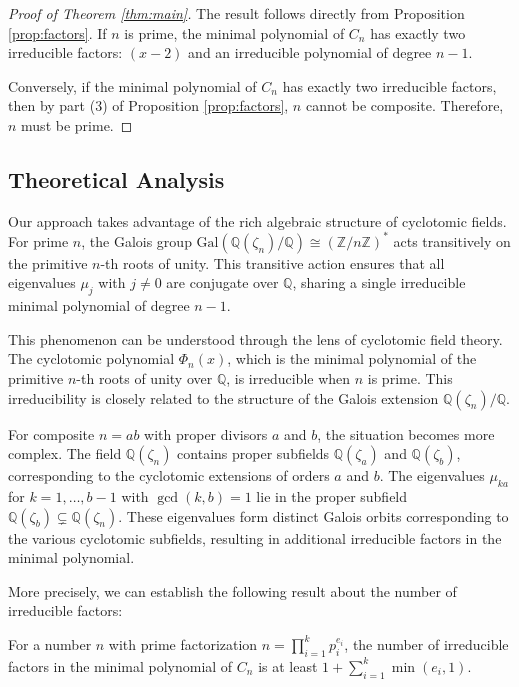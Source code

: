 \begin{proof}[Proof of Theorem \ref{thm:main}]
The result follows directly from Proposition \ref{prop:factors}. If $n$ is prime, the minimal polynomial of $C_n$ has exactly two irreducible factors: $(x-2)$ and an irreducible polynomial of degree $n-1$.

Conversely, if the minimal polynomial of $C_n$ has exactly two irreducible factors, then by part (3) of Proposition \ref{prop:factors}, $n$ cannot be composite. Therefore, $n$ must be prime.
\end{proof}

\subsection{Theoretical Analysis}

Our approach takes advantage of the rich algebraic structure of cyclotomic fields. For prime $n$, the Galois group $\text{Gal}(\mathbb{Q}(\zeta_n)/\mathbb{Q}) \cong (\mathbb{Z}/n\mathbb{Z})^*$ acts transitively on the primitive $n$-th roots of unity. This transitive action ensures that all eigenvalues $\mu_j$ with $j \neq 0$ are conjugate over $\mathbb{Q}$, sharing a single irreducible minimal polynomial of degree $n-1$.

This phenomenon can be understood through the lens of cyclotomic field theory. The cyclotomic polynomial $\Phi_n(x)$, which is the minimal polynomial of the primitive $n$-th roots of unity over $\mathbb{Q}$, is irreducible when $n$ is prime. This irreducibility is closely related to the structure of the Galois extension $\mathbb{Q}(\zeta_n)/\mathbb{Q}$.

For composite $n = ab$ with proper divisors $a$ and $b$, the situation becomes more complex. The field $\mathbb{Q}(\zeta_n)$ contains proper subfields $\mathbb{Q}(\zeta_a)$ and $\mathbb{Q}(\zeta_b)$, corresponding to the cyclotomic extensions of orders $a$ and $b$. The eigenvalues $\mu_{ka}$ for $k = 1, \ldots, b-1$ with $\gcd(k,b) = 1$ lie in the proper subfield $\mathbb{Q}(\zeta_b) \subsetneq \mathbb{Q}(\zeta_n)$. These eigenvalues form distinct Galois orbits corresponding to the various cyclotomic subfields, resulting in additional irreducible factors in the minimal polynomial.

More precisely, we can establish the following result about the number of irreducible factors:

\begin{proposition}\label{prop:factor_count}
For a number $n$ with prime factorization $n = \prod_{i=1}^k p_i^{e_i}$, the number of irreducible factors in the minimal polynomial of $C_n$ is at least $1 + \sum_{i=1}^k \min(e_i, 1)$.
\end{proposition}

